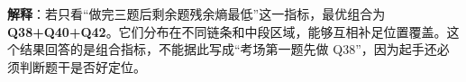 \textbf{解释}：若只看“做完三题后剩余题残余熵最低”这一指标，最优组合为\textbf{Q38+Q40+Q42}。它们分布在不同链条和中段区域，能够互相补足位置覆盖。这个结果回答的是组合指标，不能据此写成“考场第一题先做 Q38”，因为起手还必须判断题干是否好定位。